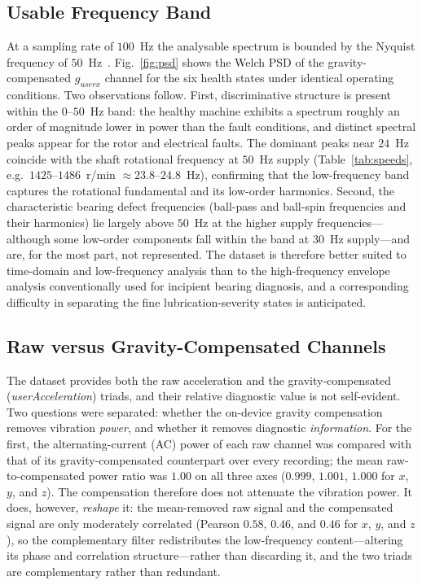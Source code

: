\subsection{Usable Frequency Band}
At a sampling rate of $100$~Hz the analysable spectrum is bounded by the Nyquist
frequency of $50$~Hz~\cite{nyquist1924certain, shannon1948mathematical}.
Fig.~\ref{fig:psd} shows the Welch PSD of the gravity-compensated $g_{userx}$
channel for the six health states under identical operating conditions. Two
observations follow. First, discriminative structure is present within the
$0$--$50$~Hz band: the healthy machine exhibits a spectrum roughly an order of
magnitude lower in power than the fault conditions, and distinct spectral peaks
appear for the rotor and electrical faults. The dominant peaks near $24$~Hz
coincide with the shaft rotational frequency at $50$~Hz supply
(Table~\ref{tab:speeds}, e.g.\ $1425$--$1486$~r/min $\approx 23.8$--$24.8$~Hz),
confirming that the low-frequency band captures the rotational fundamental and
its low-order harmonics. Second, the characteristic bearing defect frequencies
(ball-pass and ball-spin frequencies and their harmonics) lie largely above
$50$~Hz at the higher supply frequencies---although some low-order components fall
within the band at $30$~Hz supply---and are, for the most part, not represented.
The dataset is therefore better suited to time-domain and low-frequency analysis
than to the high-frequency envelope analysis conventionally used for incipient
bearing diagnosis, and a corresponding difficulty in separating the fine
lubrication-severity states is anticipated.

\subsection{Raw versus Gravity-Compensated Channels}
The dataset provides both the raw acceleration and the gravity-compensated
(\textit{userAcceleration}) triads, and their relative diagnostic value is not
self-evident. Two questions were separated: whether the on-device gravity
compensation removes vibration \emph{power}, and whether it removes diagnostic
\emph{information}. For the first, the alternating-current (AC) power of each raw
channel was compared with that of its gravity-compensated counterpart over every
recording; the mean raw-to-compensated power ratio was $1.00$ on all three axes
($0.999$, $1.001$, $1.000$ for $x$, $y$, and $z$). The compensation therefore
does not attenuate the vibration power. It does, however, \emph{reshape} it: the
mean-removed raw signal and the compensated signal are only moderately correlated
(Pearson $0.58$, $0.46$, and $0.46$ for $x$, $y$, and $z$), so the complementary
filter redistributes the low-frequency content---altering its phase and
correlation structure---rather than discarding it, and the two triads are
complementary rather than redundant.

